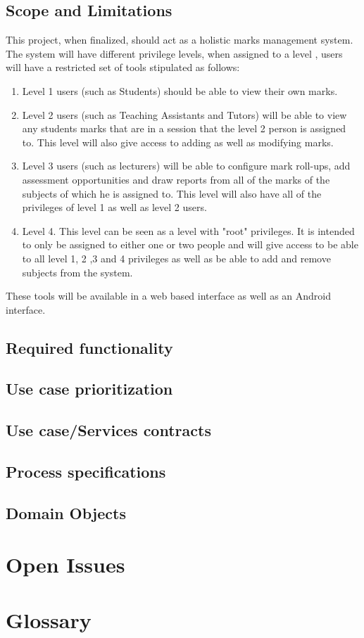\documentclass[10pt,a4paper]{article}
\begin{document}
\subsection{Scope and Limitations}
This project, when finalized, should act as a holistic marks management system. The system will have different privilege levels, when assigned to a level , users will have a restricted set of tools stipulated as follows: 
\begin{enumerate}
\item Level 1 users (such as Students) should be able to view their own marks.
\item Level 2 users (such as Teaching Assistants and Tutors) will be able to view any students marks that are in a session that the level 2 person is assigned to. This level will also give access to adding as well as modifying marks.
\item Level 3 users (such as lecturers) will be able to configure mark roll-ups, add assessment opportunities and draw reports from all of the marks of the subjects of which he is assigned to. This level will also have all of the privileges of level 1 as well as level 2 users.
\item Level 4. This level can be seen as a level with "root" privileges. It is intended to only be assigned to either one or two people and will give access to be able to all level 1, 2 ,3 and 4 privileges as well as be able to add and remove subjects from the system. 
\end{enumerate}
These tools will be available in a web based interface as well as an Android interface.
\subsection{Required functionality}
\subsection{Use case prioritization}
\subsection{Use case/Services contracts}
\subsection{Process specifications}
\subsection{Domain Objects}

\section{Open Issues}
\section{Glossary}
\end{document}
